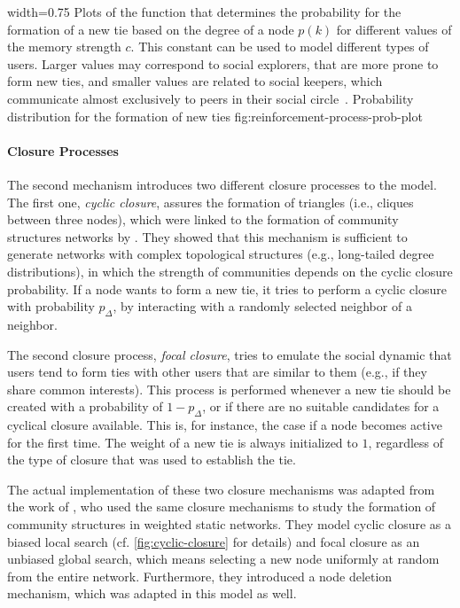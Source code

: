       {width=0.75\textwidth}
      {Plots of the function that determines the probability for the formation of a new tie based on the degree of a node \( p(k) \) for different values of the memory strength \( c \). This constant can be used to model different types of users. Larger values may correspond to social explorers, that are more prone to form new ties, and smaller values are related to social keepers, which communicate almost exclusively to peers in their social circle~\cite{Miritello2013}.}
      {Probability distribution for the formation of new ties}
      {fig:reinforcement-process-prob-plot}


\paragraph{Closure Processes}
The second mechanism introduces two different closure processes to the model.
The first one, \emph{cyclic closure}, assures the formation of triangles (i.e., cliques between three nodes), which were linked to the formation of community structures networks by \citet{Bianconi2014}.
They showed that this mechanism is sufficient to generate networks with complex topological structures (e.g., long-tailed degree distributions), in which the strength of communities depends on the cyclic closure probability.
If a node wants to form a new tie, it tries to perform a cyclic closure with probability \( p_{\Delta} \), by interacting with a randomly selected neighbor of a neighbor.

The second closure process, \emph{focal closure}, tries to emulate the social dynamic that users tend to form ties with other users that are similar to them (e.g., if they share common interests).
This process is performed whenever a new tie should be created with a probability of \( 1 - p_{\Delta} \), or if there are no suitable candidates for a cyclical closure available.
This is, for instance, the case if a node becomes active for the first time.
The weight of a new tie is always initialized to \( 1 \), regardless of the type of closure that was used to establish the tie.

The actual implementation of these two closure mechanisms was adapted from the work of \citet{Kumpula2007}, who used the same closure mechanisms to study the formation of community structures in weighted static networks.
They model cyclic closure as a biased local search (cf. \cref{fig:cyclic-closure} for details) and focal closure as an unbiased global search, which means selecting a new node uniformly at random from the entire network.
Furthermore, they introduced a node deletion mechanism, which was adapted in this model as well.



